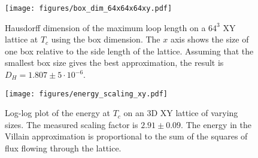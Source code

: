 \begin{figure}[h!]
    \centering
        \texttt{[image: figures/box\_dim\_64x64x64xy.pdf]}
    \caption{Hausdorff dimension of the maximum loop length on a $64^3$ XY lattice at $T_c$ using the box dimension. The $x$ axis shows the size of one box relative to the side length of the lattice. Assuming that the smallest box size gives the best approximation, the result is $D_H = 1.807 \pm 5 \cdot 10^{-6}$.}
    \label{fig:results_boxdimension}
\end{figure}


\begin{figure}[h!]
    \centering
        \texttt{[image: figures/energy\_scaling\_xy.pdf]}
    \caption{Log-log plot of the energy at $T_c$ on an 3D XY lattice of varying sizes. The measured scaling factor is $2.91 \pm 0.09$. The energy in the Villain approximation is proportional to the sum of the squares of flux flowing through the lattice.}
    \label{fig:results_energyxy}
\end{figure}